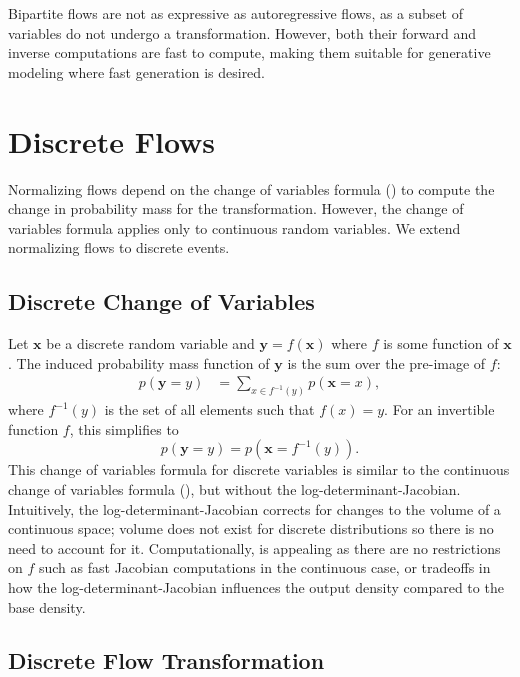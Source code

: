 \documentclass{article}
\newcommand{\mathbold}[1]{\ensuremath{\boldsymbol{\mathbf{#1}}}}
\newcommand{\nestedmathbold}[1]{{\mathbold{#1}}}
\newcommand{\mbx}{\nestedmathbold{x}}
\newcommand{\mby}{\nestedmathbold{y}}
\begin{document}
Bipartite flows are not as expressive as autoregressive flows, as a subset of variables do not undergo a transformation. However, both their forward and inverse computations are fast to compute, making them suitable for generative modeling where fast generation is desired.

\section{Discrete Flows}
\label{sec:discrete}

Normalizing flows depend on the change of variables formula () to compute the change in probability mass for the transformation. However, the change of variables formula applies only to continuous random variables. We extend normalizing flows to discrete events.


\subsection{Discrete Change of Variables}

Let $\mbx$ be a discrete random variable and $\mby = f(\mbx)$ where $f$ is some function of $\mbx$. The induced probability mass function of $\mby$ is the sum over the pre-image of $f$:
\begin{align*}
p(\mby = y) &= \sum_{x \in f^{-1}(y)} p(\mbx = x),
\end{align*}
where $f^{-1}(y)$ is the set of all elements such that $f(x) = y$. For an invertible function $f$, this simplifies to
\begin{equation}
\label{eq:discrete-change-of-variables}
p(\mby = y) = p(\mbx = f^{-1}(y)).
\end{equation}
This change of variables formula for discrete variables is similar to
the continuous change of variables formula (), but without the log-determinant-Jacobian. Intuitively, the log-determinant-Jacobian corrects for changes to the volume of a continuous space; volume does not exist for discrete distributions so there is no need to account for it. Computationally,  is appealing as there are no restrictions on $f$ such as fast Jacobian computations in the continuous case, or tradeoffs in how the log-determinant-Jacobian influences the output density compared to the base density.

\subsection{Discrete Flow Transformation}
\end{document}
